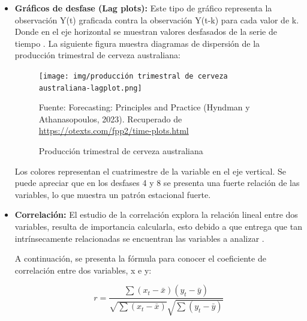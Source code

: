 \begin{itemize}
    \item \textbf{Gráficos de desfase (Lag plots):} Este tipo de gráfico representa la observación Y(t) graficada contra la observación Y(t-k) para cada valor de k. Donde en el eje horizontal se muestran valores desfasados de la serie de tiempo \cite{forecast-time-series-arima}. La siguiente figura muestra diagramas de dispersión de la producción trimestral de cerveza australiana:
    
    \begin{figure}[H]
        \begin{minipage}[t]{0.9\textwidth}
            \caption{Producción trimestral de cerveza australiana}
            \label{lagplot}        
        \end{minipage}
    
        \vspace{10pt}
    
        \begin{minipage}[b]{1.1\textwidth}
            \centering
            \texttt{[image: img/producción trimestral de cerveza australiana-lagplot.png]}        
        \end{minipage}
    
        \begin{minipage}[t]{0.9\textwidth}
            Fuente: Forecasting: Principles and Practice (Hyndman y Athanasopoulos, 2023). Recuperado de \url{https://otexts.com/fpp2/time-plots.html}
        \end{minipage}
    \end{figure}
    
    Los colores representan el cuatrimestre de la variable en el eje vertical. Se puede apreciar que en los desfases 4 y 8 se presenta una fuerte relación de las variables, lo que muestra un patrón estacional fuerte. 

    \item \textbf{Correlación:} El estudio de la correlación explora la relación lineal entre dos variables, resulta de importancia calcularla, esto debido a que entrega que tan intrínsecamente relacionadas se encuentran las variables a analizar \cite{forecast-time-series-arima}. 
    
    A continuación, se presenta la fórmula para conocer el coeficiente de correlación entre dos variables, x e y:

    \begin{equation*}
        r = \frac{\sum{(x_t - \bar{x})(y_t - \bar{y})}}{{\sqrt{\sum{(x_t - \bar{x})}}\sqrt{\sum{(y_t - \bar{y})}}}}
    \end{equation*}    
    

\end{itemize}
